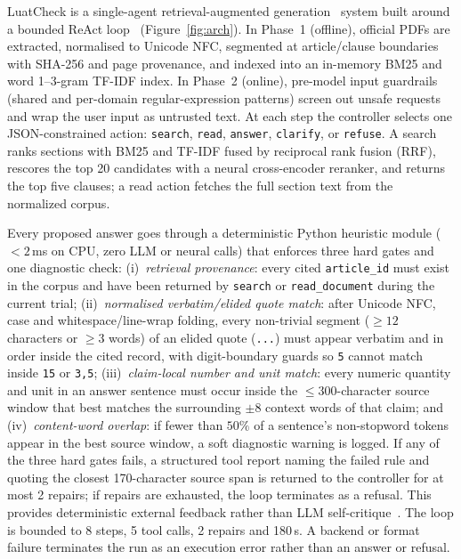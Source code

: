 LuatCheck is a single-agent retrieval-augmented generation~\citep{lewis2020rag} system built around a bounded ReAct loop~\citep{yao2023react} (Figure~\ref{fig:arch}). In Phase~1 (offline), official PDFs are extracted, normalised to Unicode NFC, segmented at article/clause boundaries with SHA-256 and page provenance, and indexed into an in-memory BM25 and word 1--3-gram TF-IDF index. In Phase~2 (online), pre-model input guardrails (shared and per-domain regular-expression patterns) screen out unsafe requests and wrap the user input as untrusted text. At each step the controller selects one JSON-constrained action: \texttt{search}, \texttt{read}, \texttt{answer}, \texttt{clarify}, or \texttt{refuse}. A search ranks sections with BM25 and TF-IDF fused by reciprocal rank fusion (RRF), rescores the top 20 candidates with a neural cross-encoder reranker, and returns the top five clauses; a read action fetches the full section text from the normalized corpus.

 Every proposed answer goes through a deterministic Python heuristic module ($<2$\,ms on CPU, zero LLM or neural calls) that enforces three hard gates and one diagnostic check: (i)~\emph{retrieval provenance}: every cited \texttt{article\_id} must exist in the corpus and have been returned by \texttt{search} or \texttt{read\_document} during the current trial; (ii)~\emph{normalised verbatim/elided quote match}: after Unicode NFC, case and whitespace/line-wrap folding, every non-trivial segment ($\ge 12$ characters or $\ge 3$ words) of an elided quote (\texttt{...}) must appear verbatim and in order inside the cited record, with digit-boundary guards so \texttt{5} cannot match inside \texttt{15} or \texttt{3,5}; (iii)~\emph{claim-local number and unit match}: every numeric quantity and unit in an answer sentence must occur inside the $\le 300$-character source window that best matches the surrounding $\pm 8$ context words of that claim; and (iv)~\emph{content-word overlap}: if fewer than $50\%$ of a sentence's non-stopword tokens appear in the best source window, a soft diagnostic warning is logged. If any of the three hard gates fails, a structured tool report naming the failed rule and quoting the closest 170-character source span is returned to the controller for at most 2 repairs; if repairs are exhausted, the loop terminates as a refusal. This provides deterministic external feedback rather than LLM self-critique~\citep{huang2024selfcorrect}. The loop is bounded to 8 steps, 5 tool calls, 2 repairs and 180\,s. A backend or format failure terminates the run as an execution error rather than an answer or refusal.

